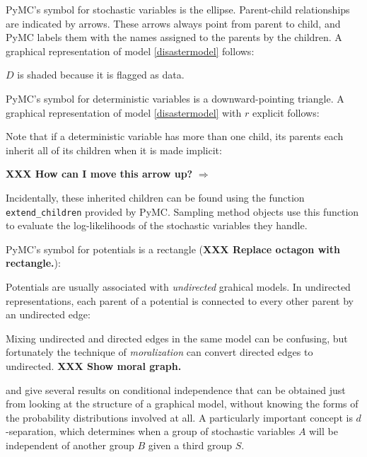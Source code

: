 PyMC's symbol for stochastic variables is the ellipse. Parent-child relationships are indicated by arrows. These arrows always point from parent to child, and PyMC labels them with the names assigned to the parents by the children. A graphical representation of model \ref{disastermodel} follows:
\begin{center}
\end{center} 
$D$ is shaded because it is flagged as data.

PyMC's symbol for deterministic variables is a downward-pointing triangle. A graphical representation of model \ref{disastermodel} with $r$ explicit follows:
\begin{center}
\end{center}
Note that if a deterministic variable has more than one child, its parents each inherit all of its children when it is made implicit:
\begin{center}
     \textbf{XXX How can I move this arrow up?} $\Rightarrow$ 
\end{center}
Incidentally, these inherited children can be found using the function \texttt{extend\_children} provided by PyMC. Sampling method objects use this function to evaluate the log-likelihoods of the stochastic variables they handle.

PyMC's symbol for potentials is a rectangle (\textbf{XXX Replace octagon with rectangle.}):
\begin{center}
\end{center}
Potentials are usually associated with \emph{undirected} grahical models. In undirected representations, each parent of a potential is connected to every other parent by an undirected edge:
\begin{center}
\end{center}
Mixing undirected and directed edges in the same model can be confusing, but fortunately the technique of \emph{moralization} can convert directed edges to undirected. \textbf{XXX Show moral graph.}

\cite{dawidmarkov} and \cite{jordangraphical} give several results on conditional independence that can be obtained just from looking at the structure of a graphical model, without knowing the forms of the probability distributions involved at all. A particularly important concept is $d$-separation, which determines when a group of stochastic variables $A$ will be independent of another group $B$ given a third group $S$.

